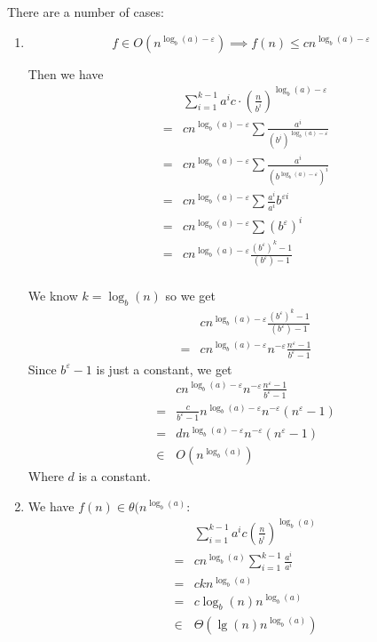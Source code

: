 \documentclass[12pt]{article}
\begin{document}
There are a number of cases:
\begin{enumerate}
    \item \[
        f \in O(n^{\log_b(a) - \varepsilon}) \implies f(n) \leq
        cn^{\log_b(a)-\varepsilon}\]

        Then we have
        \begin{eqnarray*}
            &&\sum_{i=1}^{k-1}a^i c\cdot\left( \frac{n}{b^i} \right)^{\log_b(a) -
            \varepsilon}\\
            &=& cn^{\log_b(a)-\varepsilon} \sum \frac{a^i}{\left( b^i
            \right)^{\log_b(a)-\varepsilon}}\\
            &=& cn^{\log_b(a)-\varepsilon} \sum \frac{a^i}{
            \left(b^{\log_b(a)-\varepsilon}\right)^i}\\
            &=& cn^{\log_b(a)-\varepsilon} \sum \frac{a^i}{a^i}b^{\varepsilon i}\\
            &=& cn^{\log_b(a)-\varepsilon} \sum \left(b^\varepsilon\right)^i\\
            &=& cn^{\log_b(a)-\varepsilon} \frac{(b^\varepsilon)^k -
            1}{(b^\varepsilon)-1}\\
        \end{eqnarray*}

        We know $k = \log_b(n)$ so we get
        \begin{eqnarray*}
            && cn^{\log_b(a)-\varepsilon} \frac{(b^\varepsilon)^k -
            1}{(b^\varepsilon)-1}\\
            &=& cn^{\log_b(a)-\varepsilon}n^{-\varepsilon} \frac{n^\varepsilon -
            1}{b^\varepsilon-1}
        \end{eqnarray*}
        Since $b^\varepsilon-1$ is just a constant, we get
        \begin{eqnarray*}
            && cn^{\log_b(a)-\varepsilon}n^{-\varepsilon} \frac{n^\varepsilon -
            1}{b^\varepsilon-1}\\
            &=& \frac{c}{b^\varepsilon - 1}n^{\log_b(a)-\varepsilon}n^{-\varepsilon}
            (n^\varepsilon - 1)\\
            &=& dn^{\log_b(a)-\varepsilon}n^{-\varepsilon}
            (n^\varepsilon - 1)\\
            &\in& O(n^{\log_b(a)})
        \end{eqnarray*}
        Where $d$ is a constant.

    \item We have $f(n) \in \theta(n^{\log_b(a)}$:
        \begin{eqnarray*}
            &&\sum_{i=1}^{k-1} a^i c\left( \frac{n}{b^i} \right)^{\log_b(a)}\\
            &=&cn^{\log_b(a)}\sum_{i=1}^{k-1} \frac{a^i}{a^i}\\
            &=&ckn^{\log_b(a)}\\
            &=&c\log_b(n)n^{\log_b(a)}\\
            &\in&\Theta(\lg(n)n^{\log_b(a)})
        \end{eqnarray*}


\end{enumerate}
\end{document}
